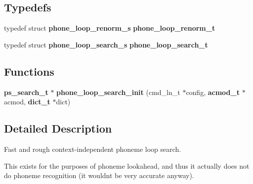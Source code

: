 \subsection*{Typedefs}
\begin{DoxyCompactItemize}
\item 
typedef struct {\bf phone\+\_\+loop\+\_\+renorm\+\_\+s} {\bfseries phone\+\_\+loop\+\_\+renorm\+\_\+t}\label{phone__loop__search_8h_a313734607dd312343fd138ccc32b9228}

\item 
typedef struct {\bf phone\+\_\+loop\+\_\+search\+\_\+s} {\bfseries phone\+\_\+loop\+\_\+search\+\_\+t}\label{phone__loop__search_8h_aff0f48051fd9e2725230896875887aa2}

\end{DoxyCompactItemize}
\subsection*{Functions}
\begin{DoxyCompactItemize}
\item 
{\bf ps\+\_\+search\+\_\+t} $\ast$ {\bfseries phone\+\_\+loop\+\_\+search\+\_\+init} (cmd\+\_\+ln\+\_\+t $\ast$config, {\bf acmod\+\_\+t} $\ast$acmod, {\bf dict\+\_\+t} $\ast$dict)\label{phone__loop__search_8h_a2308707c1a22ea9b0495f6c7f151f806}

\end{DoxyCompactItemize}


\subsection{Detailed Description}
Fast and rough context-\/independent phoneme loop search. 

This exists for the purposes of phoneme lookahead, and thus it actually does not do phoneme recognition (it wouldn\textquotesingle{}t be very accurate anyway). 